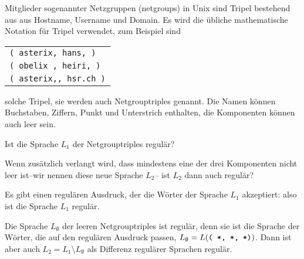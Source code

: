 Mitglieder sogenannter Netzgruppen (netgroups) in Unix sind Tripel
bestehend aus aus Hostname, Username und Domain. Es wird die übliche
mathematische Notation für Tripel verwendet, zum Beispiel sind
\begin{center}
\begin{tabular}{l}
{\tt ( asterix, hans, )}\\
{\tt ( obelix , heiri, )}\\
{\tt ( asterix,, hsr.ch )}
\end{tabular}
\end{center}
solche Tripel, sie werden auch Netgrouptriples genannt.
Die Namen können Buchstaben, Ziffern, Punkt und Unterstrich
enthalten, die Komponenten können auch leer sein.
\begin{teilaufgaben}
\item
Ist die Sprache $L_1$ der Netgrouptriples regulär?
\item
Wenn zusätzlich verlangt wird, dass mindestens eine der drei
Komponenten nicht leer ist--wir nennen diese neue Sprache $L_2$-- ist $L_2$
dann auch regulär?
\end{teilaufgaben}


\begin{loesung}
\begin{teilaufgaben}
\item
Es gibt einen regulären Ausdruck, der die Wörter der Sprache $L_1$
akzeptiert:
also ist die Sprache $L_1$ regulär.
\item
Die Sprache $L_\emptyset$ der leeren Netgrouptriples ist regulär, denn sie ist die
Sprache der Wörter, die auf den regulären Ausdruck
passen, $L_\emptyset = L(\text{\tt ( *, *, *)})$. Dann ist
aber auch $L_2=L_1\setminus L_\emptyset$ als Differenz regulärer
Sprachen regulär.
\qedhere
\end{teilaufgaben}
\end{loesung}
